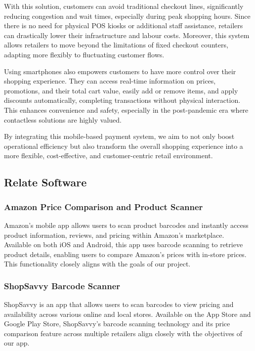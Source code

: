 \documentclass[conference]{IEEEtran}
\begin{document}
With this solution, customers can avoid traditional checkout lines, significantly reducing congestion and wait times, especially during peak shopping hours. Since there is no need for physical POS kiosks or additional staff assistance, retailers can drastically lower their infrastructure and labour costs. Moreover, this system allows retailers to move beyond the limitations of fixed checkout counters, adapting more flexibly to fluctuating customer flows. 

Using smartphones also empowers customers to have more control over their shopping experience. They can access real-time information on prices, promotions, and their total cart value, easily add or remove items, and apply discounts automatically, completing transactions without physical interaction. This enhances convenience and safety, especially in the post-pandemic era where contactless solutions are highly valued. 

By integrating this mobile-based payment system, we aim to not only boost operational efficiency but also transform the overall shopping experience into a more flexible, cost-effective, and customer-centric retail environment. 

\subsection{Relate Software}

\subsubsection{Amazon Price Comparison and Product Scanner}
Amazon’s mobile app allows users to scan product barcodes and instantly access product information, reviews, and pricing within Amazon’s marketplace. Available on both iOS and Android, this app uses barcode scanning to retrieve product details, enabling users to compare Amazon’s prices with in-store prices. This functionality closely aligns with the goals of our project.

\subsubsection{ShopSavvy Barcode Scanner}
ShopSavvy is an app that allows users to scan barcodes to view pricing and availability across various online and local stores. Available on the App Store and Google Play Store, ShopSavvy’s barcode scanning technology and its price comparison feature across multiple retailers align closely with the objectives of our app.
\end{document}
